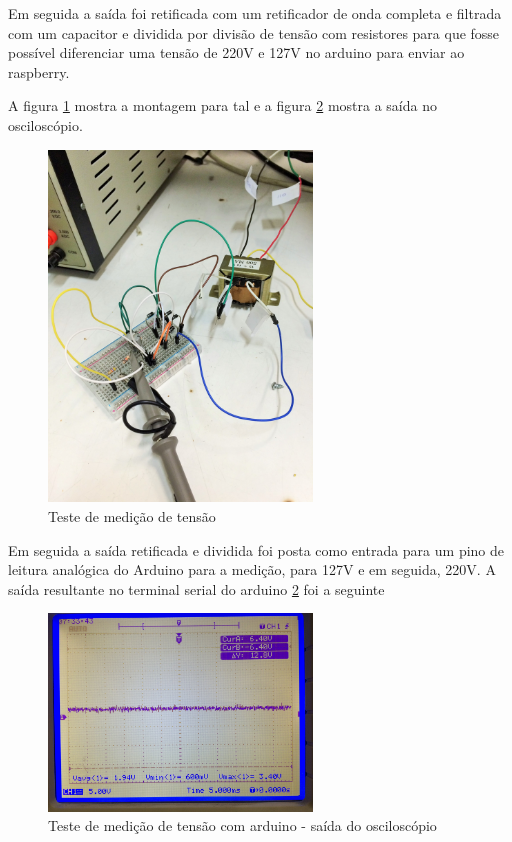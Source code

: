 Em seguida a saída foi retificada com um retificador de onda completa e filtrada com um capacitor e dividida por divisão de tensão com resistores para que fosse possível diferenciar uma tensão de 220V e 127V no arduino para enviar ao raspberry.

A figura \ref{fig:teste-medicao-voltagem} mostra a montagem para tal e a figura \ref{fig:teste-medicao-voltagem-osc} mostra a saída no osciloscópio.

\begin{figure}[H]
\centering
\includegraphics[width=7cm,keepaspectratio]{figuras/teste-medicao-voltagem.jpg} 
\caption{\label{fig:teste-medicao-voltagem} Teste de medição de tensão} 
\end{figure}

Em seguida a saída retificada e dividida foi posta como entrada para um pino de leitura analógica do Arduino para a medição, para 127V e em seguida, 220V. A saída resultante no terminal serial do arduino \ref{fig:teste-medicao-voltagem-osc} foi a seguinte

\begin{figure}[H]
\centering
\includegraphics[width=7cm,keepaspectratio]{figuras/teste-medicao-voltagem-osc.jpg} 
\caption{\label{fig:teste-medicao-voltagem-osc} Teste de medição de tensão com arduino - saída do osciloscópio}
\end{figure}

